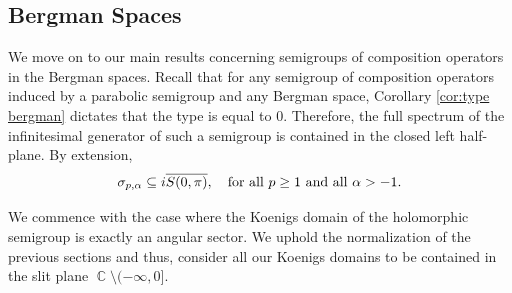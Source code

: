 \documentclass[11pt]{amsart}
\numberwithin{equation}{section}
\theoremstyle{definition}
\DeclareMathOperator{\C}{\mathbb{C}}
\begin{document}
	
	
	
	\subsection{Bergman Spaces}
	We move on to our main results concerning semigroups of composition operators in the Bergman spaces. Recall that for any semigroup of composition operators induced by a parabolic semigroup and any Bergman space, Corollary \ref{cor:type bergman} dictates that the type is equal to $0$. Therefore, the full spectrum of the infinitesimal generator of such a semigroup is contained in the closed left half-plane. By extension, 
	\begin{equation}\label{eq:spectrum bergman inclusion}
		\sigma_{p,\alpha}\subseteq i\overline{S(0,\pi)}, \quad \textup{for all }p\ge1 \textup{ and all }\alpha>-1.
	\end{equation} 
	
	We commence with the case where the Koenigs domain of the holomorphic semigroup is exactly an angular sector. We uphold the normalization of the previous sections and thus, consider all our Koenigs domains to be contained in the slit plane $\C\setminus(-\infty,0]$.
	
\end{document}
